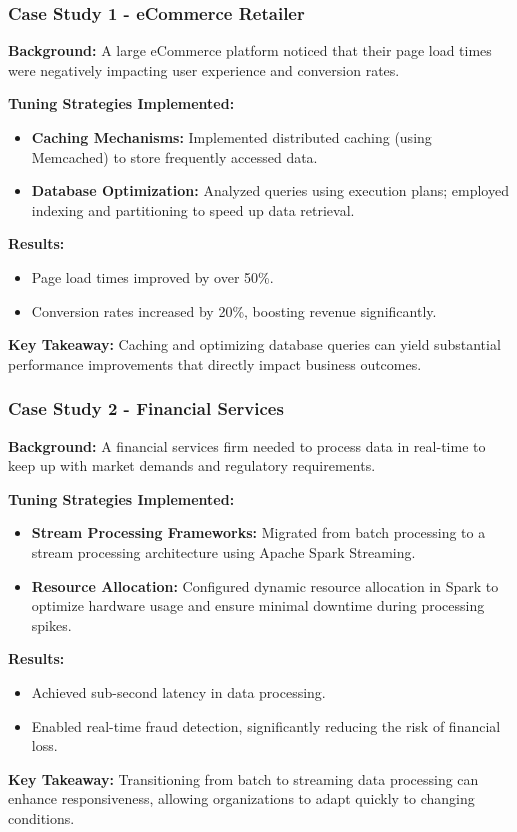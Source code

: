 \documentclass[aspectratio=169]{beamer}
\begin{document}
\begin{frame}[fragile]
    \frametitle{Case Study 1 - eCommerce Retailer}
    \textbf{Background:}  
    A large eCommerce platform noticed that their page load times were negatively impacting user experience and conversion rates.

    \textbf{Tuning Strategies Implemented:}
    \begin{itemize}
        \item \textbf{Caching Mechanisms:} Implemented distributed caching (using Memcached) to store frequently accessed data.
        \item \textbf{Database Optimization:} Analyzed queries using execution plans; employed indexing and partitioning to speed up data retrieval.
    \end{itemize}

    \textbf{Results:}
    \begin{itemize}
        \item Page load times improved by over 50\%.
        \item Conversion rates increased by 20\%, boosting revenue significantly.
    \end{itemize}

    \textbf{Key Takeaway:} Caching and optimizing database queries can yield substantial performance improvements that directly impact business outcomes.
\end{frame}

\begin{frame}[fragile]
    \frametitle{Case Study 2 - Financial Services}
    \textbf{Background:}  
    A financial services firm needed to process data in real-time to keep up with market demands and regulatory requirements.

    \textbf{Tuning Strategies Implemented:}
    \begin{itemize}
        \item \textbf{Stream Processing Frameworks:} Migrated from batch processing to a stream processing architecture using Apache Spark Streaming.
        \item \textbf{Resource Allocation:} Configured dynamic resource allocation in Spark to optimize hardware usage and ensure minimal downtime during processing spikes.
    \end{itemize}

    \textbf{Results:}
    \begin{itemize}
        \item Achieved sub-second latency in data processing.
        \item Enabled real-time fraud detection, significantly reducing the risk of financial loss.
    \end{itemize}

    \textbf{Key Takeaway:} Transitioning from batch to streaming data processing can enhance responsiveness, allowing organizations to adapt quickly to changing conditions.
\end{frame}
\end{document}
